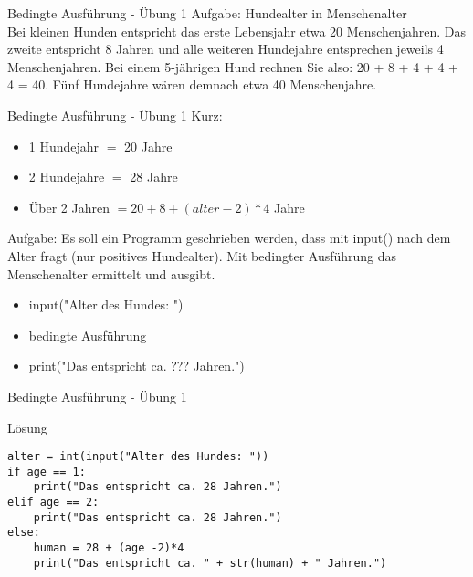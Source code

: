 \begin{frame}{Bedingte Ausführung - Übung 1}
Aufgabe: Hundealter in Menschenalter\\
Bei kleinen Hunden entspricht das erste Lebensjahr etwa 20 Menschenjahren. Das zweite entspricht 8 Jahren und alle weiteren Hundejahre entsprechen jeweils 4 Menschenjahren. Bei einem 5-jährigen Hund rechnen Sie also: 20 + 8 + 4 + 4 + 4 = 40. Fünf Hundejahre wären demnach etwa 40 Menschenjahre.\\
\end{frame}
\begin{frame}{Bedingte Ausführung - Übung 1}
Kurz:
\begin{itemize}
\item 1 Hundejahr $=$ 20 Jahre
\item 2 Hundejahre $=$ 28 Jahre
\item Über 2 Jahren $= 20 + 8 + (alter - 2)  *  4$ Jahre
\end{itemize}
Aufgabe:
Es soll ein Programm geschrieben werden, dass mit input() nach dem Alter fragt (nur positives Hundealter). Mit bedingter Ausführung das Menschenalter ermittelt und ausgibt.
\begin{itemize}
	\item input("Alter des Hundes: ")
	\item bedingte Ausführung
	\item print("Das entspricht ca. ??? Jahren.")
\end{itemize}

\end{frame}

\begin{frame}[fragile]{Bedingte Ausführung - Übung 1 }
\begin{exampleblock}{Lösung}
\begin{lstlisting}
alter = int(input("Alter des Hundes: "))
if age == 1:
	print("Das entspricht ca. 28 Jahren.")
elif age == 2:
	print("Das entspricht ca. 28 Jahren.")
else:
	human = 28 + (age -2)*4
	print("Das entspricht ca. " + str(human) + " Jahren.")
\end{lstlisting}
\end{exampleblock}
\end{frame}



